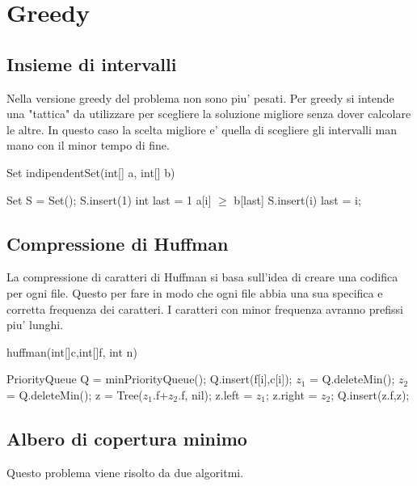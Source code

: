 \documentclass[oneside]{book}
\begin{document}
\chapter{Greedy}
\section{Insieme di intervalli}
Nella versione greedy del problema non sono piu' pesati. Per greedy si intende una "tattica" da utilizzare per scegliere la soluzione migliore senza dover calcolare le altre. In questo caso la scelta migliore e' quella di scegliere gli intervalli man mano con il minor tempo di fine. 


\begin{algorithm}
\caption{Set indipendentSet(int[] a, int[] b)\label{alg:cap}}
\begin{algorithmic}
Set S = Set();
S.insert(1)
int last = 1
	\If
		{a[i] $\geq $ b[last]}
		\State S.insert(i)
		\State last = i;
	\EndIf
\EndFor
\end{algorithmic}
\end{algorithm}
\newpage
\section{Compressione di Huffman}
La compressione di caratteri di Huffman si basa sull'idea di creare una codifica per ogni file. Questo per fare in modo che ogni file abbia una sua specifica e corretta frequenza dei caratteri. I caratteri con minor frequenza avranno prefissi piu' lunghi.

\begin{algorithm}
\caption{huffman(int[]c,int[]f, int n)\label{alg:cap}}
\begin{algorithmic}
\State PriorityQueue Q = minPriorityQueue();
	\State Q.insert(f[i],c[i]);
\EndFor
{}
	\State $z_1$ = Q.deleteMin();
	\State $z_2$ = Q.deleteMin();
	\State z = Tree($z_1$.f+$z_2$.f, nil);	
	\State z.left = $z_1$;
	\State z.right = $z_2$;
	\State Q.insert(z.f,z);
\EndFor
\end{algorithmic}
\end{algorithm}

\newpage
\section{Albero di copertura minimo}
Questo problema viene risolto da due algoritmi. 
\end{document}
